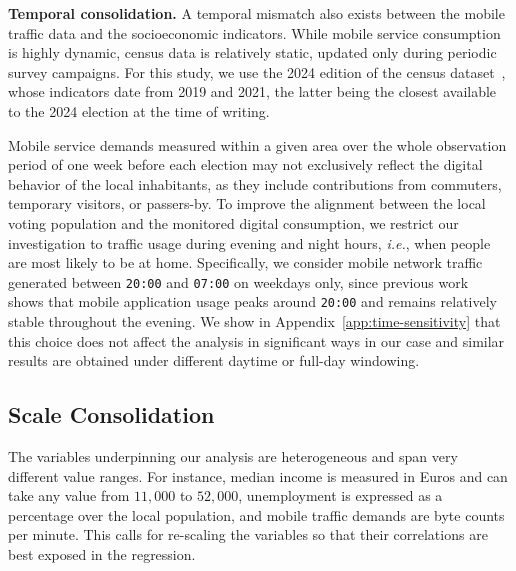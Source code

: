 \documentclass[9pt,sigconf,letterpaper]{acmart}
\newcommand{\ie}{\textit{i.e.},\xspace}
\begin{document}
\noindent\textbf{Temporal consolidation.}
A temporal mismatch also exists between the mobile traffic data and the socioeconomic indicators.
While mobile service consumption is highly dynamic, census data is relatively static, updated only during periodic survey campaigns.
For this study, we use the 2024 edition of the census dataset~\cite{soc_pop_income_educ_commune}, whose indicators date from 2019 and 2021, the latter being the closest available to the 2024 election at the time of writing.

Mobile service demands measured within a given area over the whole observation period of one week before each election may not exclusively reflect the digital behavior of the local inhabitants, as they include contributions from commuters, temporary visitors, or passers-by.
To improve the alignment between the local voting population and the monitored digital consumption, we restrict our investigation to traffic usage during evening and night hours, \ie when people are most likely to be at home.
Specifically, we consider mobile network traffic generated between \texttt{20:00} and \texttt{07:00} on weekdays only, since previous work~\cite{usage_8} shows that mobile application usage peaks around \texttt{20:00} and remains relatively stable throughout the evening.
We show in Appendix~\ref{app:time-sensitivity} that this choice does not affect the analysis in significant ways in our case and similar results are obtained under different daytime or full-day windowing.


\subsection{Scale Consolidation}
\label{sec:data-scale}

The variables underpinning our analysis are heterogeneous and span very different value ranges. For instance, median income is measured in Euros and can take any value 
from $11{,}000$ to $52{,}000$, unemployment is expressed as a percentage over the local population, and mobile traffic demands are byte counts per minute. 
This calls for re-scaling the variables so that their correlations are best exposed in the regression.
\end{document}
